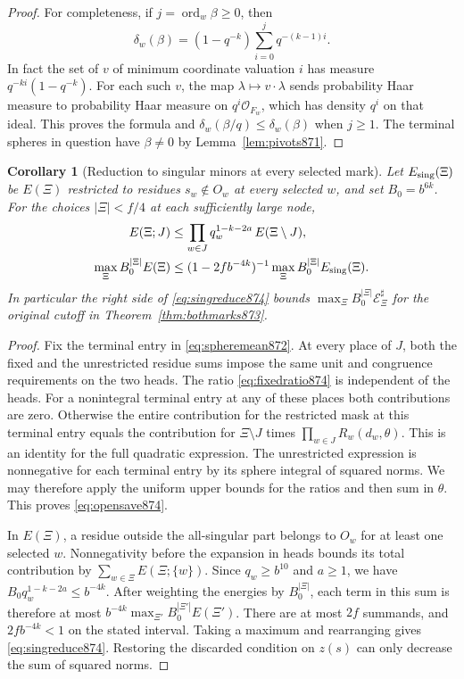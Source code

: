 \documentclass[a4paper,11pt]{article}
\newtheorem{corollary}[proposition]{Corollary}
\theoremstyle{definition}
\theoremstyle{remark}
\numberwithin{equation}{section}
\begin{document}
\begin{proof}
For completeness, if \(j=\operatorname{ord}_w\beta\ge0\), then
\[
 \delta_w(\beta)=(1-q^{-k})\sum_{i=0}^{j}q^{-(k-1)i}.
\]
In fact the set of \(v\) of minimum coordinate valuation \(i\) has
measure \(q^{-ki}(1-q^{-k})\). For each such \(v\), the map
\(\lambda\mapsto v\cdot\lambda\) sends probability Haar measure to
probability Haar measure on \(q^i\mathcal O_{F_w}\), which has
density \(q^i\) on that ideal. This proves the formula and
\(\delta_w(\beta/q)\le\delta_w(\beta)\) when \(j\ge1\). The terminal
spheres in question have \(\beta\ne0\) by Lemma~\ref{lem:pivots871}.
\end{proof}

\begin{corollary}[Reduction to singular minors at every selected mark]
\leavevmode\label{cor:singularselected874}
Let \(E_{\rm sing}(\Xi)\) be \(E(\Xi)\) restricted to residues
\(s_w\notin O_w\) at every selected \(w\), and set \(B_0=b^{6k}\).
For the choices \(|\Xi|<f/4\) at each sufficiently large node,
\begin{align}
 E(\Xi;J)&\le\prod_{w\in J}q_w^{1-k-2a}\,E(\Xi\setminus J),
 \label{eq:opensave874}\\
 \max_\Xi B_0^{|\Xi|} E(\Xi)
 &\le (1-2f b^{-4k})^{-1}
                 \max_\Xi B_0^{|\Xi|}E_{\rm sing}(\Xi).
 \label{eq:singreduce874}
\end{align}
In particular the right side of \eqref{eq:singreduce874} bounds
\(\max_\Xi B_0^{|\Xi|}\mathcal E_\Xi^\sharp\) for the original
cutoff in Theorem~\ref{thm:bothmarks873}.
\end{corollary}
\begin{proof}
Fix the terminal entry in \eqref{eq:spheremean872}. At every place
of \(J\), both the fixed and the unrestricted residue sums impose
the same unit and congruence requirements on the two heads.
The ratio \eqref{eq:fixedratio874} is independent of the heads.
For a nonintegral terminal entry at any of these places both
contributions are zero. Otherwise the entire contribution for the
restricted mask at this terminal entry equals the contribution for
\(\Xi\setminus J\) times \(\prod_{w\in J}R_w(d_w,\theta)\).
This is an identity for the full quadratic expression. The
unrestricted expression is nonnegative for each terminal entry by
its sphere integral of squared norms. We may therefore apply the
uniform upper bounds for the ratios and then sum in \(\theta\).
This proves \eqref{eq:opensave874}.

In \(E(\Xi)\), a residue outside the all-singular part belongs to
\(O_w\) for at least one selected \(w\). Nonnegativity before the
expansion in heads bounds its total contribution by
\(\sum_{w\in\Xi} E(\Xi;\{w\})\). Since \(q_w\ge b^{10}\) and \(a\ge1\),
we have \(B_0q_w^{1-k-2a}\le b^{-4k}\). After weighting the
energies by \(B_0^{|\Xi|}\), each term in this sum is therefore at
most \(b^{-4k}\max_{\Xi'} B_0^{|\Xi'|}E(\Xi')\).
There are at most \(2f\) summands, and \(2f b^{-4k}<1\) on the stated
interval. Taking a maximum and rearranging gives
\eqref{eq:singreduce874}. Restoring the discarded condition on \(z(s)\)
can only decrease the sum of squared norms.
\end{proof}
\end{document}
